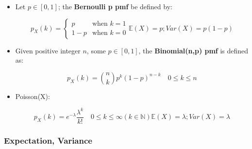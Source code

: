 \documentclass[10pt]{article}
\begin{document}
\begin{multicols}{2}
\begin{itemize}
  

\item Let $p \in [0,1]$; the \textbf{Bernoulli p pmf} be defined by:
  
  \[
    p_X(k) =
    \begin{cases}
      p & \text{when } k = 1 \\
      1 - p & \text{when } k = 0
    \end{cases}

    \mathbb{E}(X) = p; Var(X) = p(1 - p)
  \]
    
\item Given positive integer $n$, some $p \in [0,1]$, the
  \textbf{Binomial(n,p) pmf} is defined as:

  \[
    p_X(k) = {n \choose k} p^k (1 - p)^{n-k} \quad 0 \leq k \leq n
  \]



\item Poisson(X):

  \[
    p_X(k) = e^{-\lambda} \frac{\lambda^{k}}{k!} \quad 0 \leq k \leq
    \infty (k \in \mathbb{N})

    \mathbb{E}(X) = \lambda; Var(X) = \lambda
  \]
\end{itemize}
\end{multicols}


\subsubsection*{Expectation, Variance}
\end{document}

